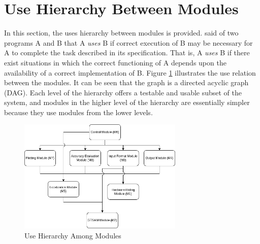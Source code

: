 \documentclass[12pt, titlepage]{article}
\begin{document}
\section{Use Hierarchy Between Modules} \label{SecUse}

In this section, the uses hierarchy between modules is
provided. \citet{Parnas1978} said of two programs A and B that A {\em uses} B if
correct execution of B may be necessary for A to complete the task described in
its specification. That is, A {\em uses} B if there exist situations in which
the correct functioning of A depends upon the availability of a correct
implementation of B.  Figure \ref{FigUH} illustrates the use relation between
the modules. It can be seen that the graph is a directed acyclic graph
(DAG). Each level of the hierarchy offers a testable and usable subset of the
system, and modules in the higher level of the hierarchy are essentially simpler
because they use modules from the lower levels.



\begin{figure}[H]
\centering
\includegraphics[width=0.7\textwidth]{UsesHierarchy.png}
\caption{Use Hierarchy Among Modules}
\label{FigUH}
\end{figure}

\end{document}
